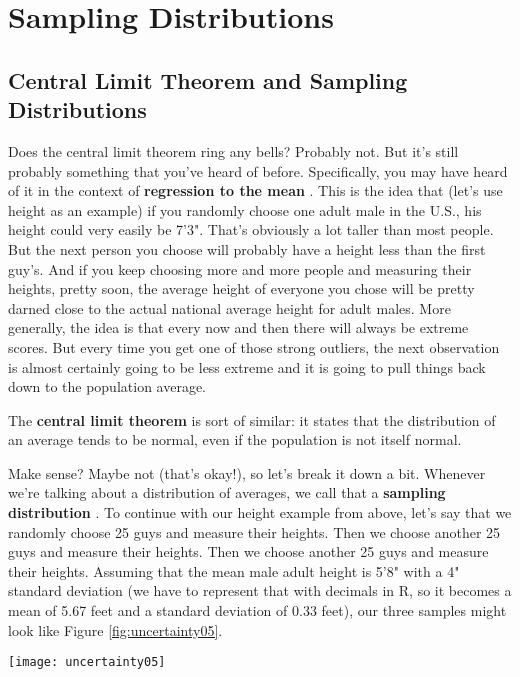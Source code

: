 \section{Sampling Distributions}

\subsection{Central Limit Theorem and Sampling Distributions}
Does the central limit theorem ring any bells? Probably not. But it's still probably something that you've heard of before. Specifically, you may have heard of it in the context of \textbf{regression to the mean} . This is the idea that (let's use height as an example) if you randomly choose one adult male in the U.S., his height could very easily be 7'3". That's obviously a lot taller than most people. But the next person you choose will probably have a height less than the first guy's. And if you keep choosing more and more people and measuring their heights, pretty soon, the average height of everyone you chose will be pretty darned close to the actual national average height for adult males. More generally, the idea is that every now and then there will always be extreme scores. But every time you get one of those strong outliers, the next observation is almost certainly going to be less extreme and it is going to pull things back down to the population average.

The \textbf{central limit theorem}  is sort of similar: it states that the distribution of an average tends to be normal, even if the population is not itself normal.

Make sense? Maybe not (that's okay!), so let's break it down a bit. Whenever we're talking about a distribution of averages, we call that a \textbf{sampling distribution} . To continue with our height example from above, let's say that we randomly choose 25 guys and measure their heights. Then we choose another 25 guys and measure their heights. Then we choose another 25 guys and measure their heights. Assuming that the mean male adult height is 5'8" with a 4" standard deviation (we have to represent that with decimals in R, so it becomes a mean of 5.67 feet and a standard deviation of 0.33 feet), our three samples might look like Figure \ref{fig:uncertainty05}.

\begin{figure*}[h!]
\texttt{[image: uncertainty05]}
\caption{Heights of three randomly-selected groups of men}
\label{fig:uncertainty05}
\end{figure*}

